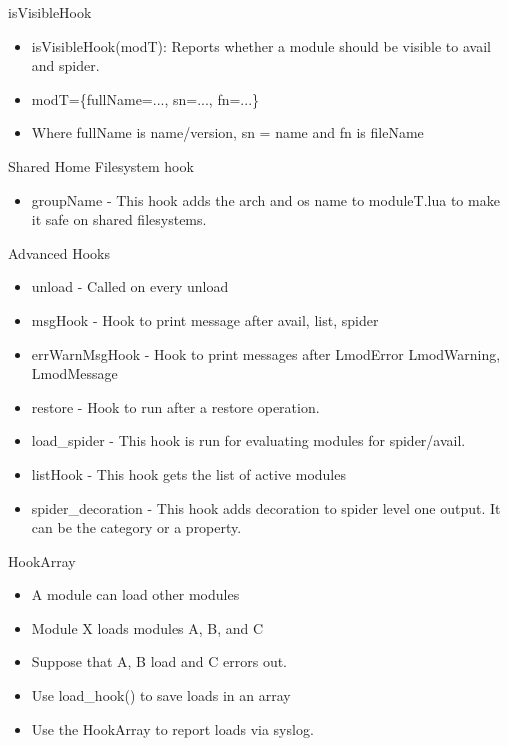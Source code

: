 \documentclass{beamer}
\begin{document}
\begin{frame}{isVisibleHook}
  \begin{itemize}
    \item isVisibleHook(modT): Reports whether a module should be visible
      to avail and spider.
    \item modT=\{fullName=..., sn=..., fn=...\}
    \item Where fullName is name/version, sn = name and fn is fileName
  \end{itemize}
\end{frame}

\begin{frame}{Shared Home Filesystem hook}
  \begin{itemize}
    \item groupName - This hook adds the arch and os name to
      moduleT.lua to make it safe on shared filesystems.
  \end{itemize}
\end{frame}

\begin{frame}{Advanced Hooks}
  \begin{itemize}
    \item unload - Called on every unload
    \item msgHook - Hook to print message after avail, list, spider
    \item errWarnMsgHook - Hook to print messages after LmodError LmodWarning, LmodMessage    
    \item restore - Hook to run after a restore operation.
    \item load\_spider - This hook is run for evaluating modules for spider/avail.
    \item listHook - This hook gets the list of active modules
    \item spider\_decoration -  This hook adds decoration to spider
      level one output. It can be the category or a property.

  \end{itemize}
\end{frame}

\begin{frame}{HookArray}
  \begin{itemize}
    \item A module can load other modules
    \item Module X loads modules A, B, and C
    \item Suppose that A, B load and C errors out.
    \item Use load\_hook() to save loads in an array
    \item Use the HookArray to report loads via syslog.
  \end{itemize}
\end{frame}
\end{document}
